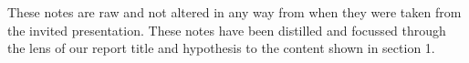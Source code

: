{}
 \label{Notes}
These notes are raw and not altered in any way from when they were taken from the invited presentation. These notes have been distilled and focussed through the lens of our report title and hypothesis to the content shown in section 1.


